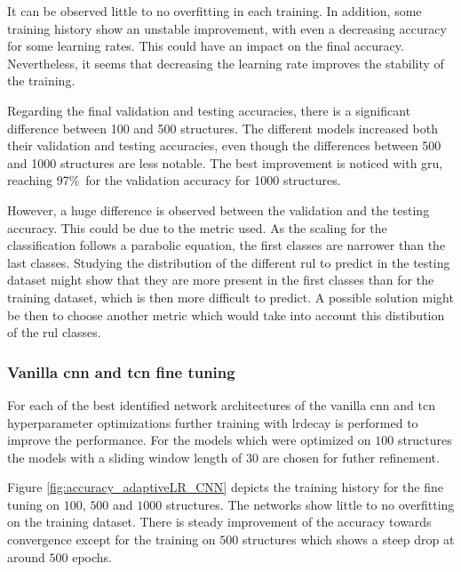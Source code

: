 \documentclass[conference]{IEEEtran}
\begin{document}
It can be observed little to no overfitting in each training. In addition, some training history show an unstable improvement, with even a decreasing accuracy for some learning rates. This could have an impact on the final accuracy. Nevertheless, it seems that decreasing the learning rate improves the stability of the training.

Regarding the final validation and testing accuracies, there is a significant difference between 100 and 500 structures. The different models increased both their validation and testing accuracies, even though the differences between 500 and 1000 structures are less notable. The best improvement is noticed with \gls{gru}, reaching 97\%\ for the validation accuracy for 1000 structures.

However, a huge difference is observed between the validation and the testing accuracy. This could be due to the metric used. As the scaling for the classification follows a parabolic equation, the first classes are narrower than the last classes. Studying the distribution of the different \gls{rul} to predict in the testing dataset might show that they are more present in the first classes than for the training dataset, which is then more difficult to predict. A possible solution might be then to choose another metric which would take into account this distibution of the \gls{rul} classes.


\subsubsection{Vanilla \gls{cnn} and \gls{tcn} fine tuning}

For each of the best identified network architectures of the vanilla \gls{cnn} and \gls{tcn} hyperparameter optimizations further training with \gls{lrdecay} is performed to improve the performance. For the models which were optimized on $ 100 $ structures the models with a sliding window length of $ 30 $ are chosen for futher refinement.

Figure \ref{fig:accuracy_adaptiveLR_CNN} depicts the training history for the fine tuning on $ 100 $, $ 500 $ and $ 1000 $ structures. The networks show little to no overfitting on the training dataset. There is steady improvement of the accuracy towards convergence except for the training on $ 500 $ structures which shows a steep drop at around $ 500 $ epochs.
\end{document}
